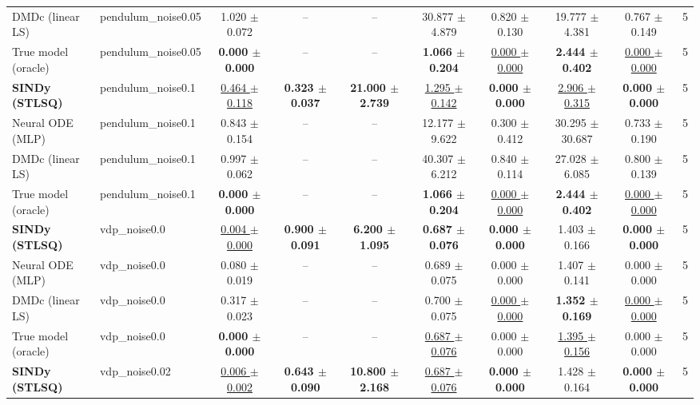 \begin{tabular}{llcccccccc}
DMDc (linear LS) & pendulum\_noise0.05 & 1.020 $\pm$ 0.072 & -- & -- & 30.877 $\pm$ 4.879 & 0.820 $\pm$ 0.130 & 19.777 $\pm$ 4.381 & 0.767 $\pm$ 0.149 & 5 \\
True model (oracle) & pendulum\_noise0.05 & \textbf{0.000 $\pm$ 0.000} & -- & -- & \textbf{1.066 $\pm$ 0.204} & \underline{0.000 $\pm$ 0.000} & \textbf{2.444 $\pm$ 0.402} & \underline{0.000 $\pm$ 0.000} & 5 \\
\midrule
\textbf{SINDy (STLSQ)} & pendulum\_noise0.1 & \underline{0.464 $\pm$ 0.118} & \textbf{0.323 $\pm$ 0.037} & \textbf{21.000 $\pm$ 2.739} & \underline{1.295 $\pm$ 0.142} & \textbf{0.000 $\pm$ 0.000} & \underline{2.906 $\pm$ 0.315} & \textbf{0.000 $\pm$ 0.000} & 5 \\
Neural ODE (MLP) & pendulum\_noise0.1 & 0.843 $\pm$ 0.154 & -- & -- & 12.177 $\pm$ 9.622 & 0.300 $\pm$ 0.412 & 30.295 $\pm$ 30.687 & 0.733 $\pm$ 0.190 & 5 \\
DMDc (linear LS) & pendulum\_noise0.1 & 0.997 $\pm$ 0.062 & -- & -- & 40.307 $\pm$ 6.212 & 0.840 $\pm$ 0.114 & 27.028 $\pm$ 6.085 & 0.800 $\pm$ 0.139 & 5 \\
True model (oracle) & pendulum\_noise0.1 & \textbf{0.000 $\pm$ 0.000} & -- & -- & \textbf{1.066 $\pm$ 0.204} & \underline{0.000 $\pm$ 0.000} & \textbf{2.444 $\pm$ 0.402} & \underline{0.000 $\pm$ 0.000} & 5 \\
\midrule
\textbf{SINDy (STLSQ)} & vdp\_noise0.0 & \underline{0.004 $\pm$ 0.000} & \textbf{0.900 $\pm$ 0.091} & \textbf{6.200 $\pm$ 1.095} & \textbf{0.687 $\pm$ 0.076} & \textbf{0.000 $\pm$ 0.000} & 1.403 $\pm$ 0.166 & \textbf{0.000 $\pm$ 0.000} & 5 \\
Neural ODE (MLP) & vdp\_noise0.0 & 0.080 $\pm$ 0.019 & -- & -- & 0.689 $\pm$ 0.075 & 0.000 $\pm$ 0.000 & 1.407 $\pm$ 0.141 & 0.000 $\pm$ 0.000 & 5 \\
DMDc (linear LS) & vdp\_noise0.0 & 0.317 $\pm$ 0.023 & -- & -- & 0.700 $\pm$ 0.075 & \underline{0.000 $\pm$ 0.000} & \textbf{1.352 $\pm$ 0.169} & \underline{0.000 $\pm$ 0.000} & 5 \\
True model (oracle) & vdp\_noise0.0 & \textbf{0.000 $\pm$ 0.000} & -- & -- & \underline{0.687 $\pm$ 0.076} & 0.000 $\pm$ 0.000 & \underline{1.395 $\pm$ 0.156} & 0.000 $\pm$ 0.000 & 5 \\
\midrule
\textbf{SINDy (STLSQ)} & vdp\_noise0.02 & \underline{0.006 $\pm$ 0.002} & \textbf{0.643 $\pm$ 0.090} & \textbf{10.800 $\pm$ 2.168} & \underline{0.687 $\pm$ 0.076} & \textbf{0.000 $\pm$ 0.000} & 1.428 $\pm$ 0.164 & \textbf{0.000 $\pm$ 0.000} & 5 \\

\end{tabular}
